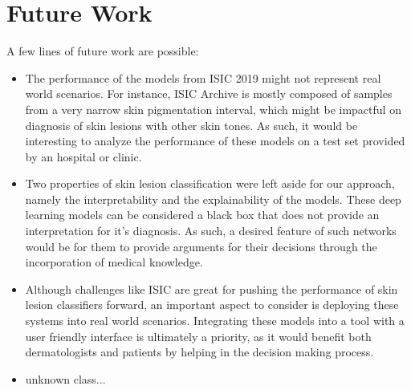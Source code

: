 \section{Future Work}

    A few lines of future work are possible:

    \begin{itemize}
        \item The performance of the models from ISIC 2019 might not represent real world scenarios. For instance, ISIC Archive is mostly composed of samples from a very narrow skin pigmentation interval, which might be impactful on diagnosis of skin lesions with other skin tones. As such, it would be interesting to analyze the performance of these models on a test set provided by an hospital or clinic.
        \item Two properties of skin lesion classification were left aside for our approach, namely the interpretability and the explainability of the models. These deep learning models can be considered a black box that does not provide an interpretation for it's diagnosis. As such, a desired feature of such networks would be for them to provide arguments for their decisions through the incorporation of medical knowledge.
        \item Although challenges like ISIC are great for pushing the performance of skin lesion classifiers forward, an important aspect to consider is deploying these systems into real world scenarios. Integrating these models into a tool with a user friendly interface is ultimately a priority, as it would benefit both dermatologists and patients by helping in the decision making process.
        \item unknown class...
    \end{itemize}
